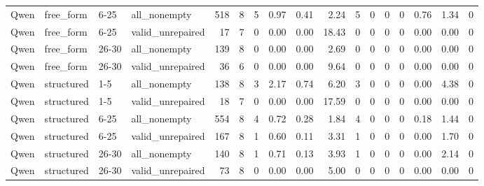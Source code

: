 \begin{longtable}{llllrrrrrrrrrrrrr}
Qwen & free\_form & 6-25 & all\_nonempty & 518 & 8 & 5 & 0.97 & 0.41 & 2.24 & 5 & 0 & 0 & 0 & 0.76 & 1.34 & 0 \\
Qwen & free\_form & 6-25 & valid\_unrepaired & 17 & 7 & 0 & 0.00 & 0.00 & 18.43 & 0 & 0 & 0 & 0 & 0.00 & 0.00 & 0 \\
Qwen & free\_form & 26-30 & all\_nonempty & 139 & 8 & 0 & 0.00 & 0.00 & 2.69 & 0 & 0 & 0 & 0 & 0.00 & 0.00 & 0 \\
Qwen & free\_form & 26-30 & valid\_unrepaired & 36 & 6 & 0 & 0.00 & 0.00 & 9.64 & 0 & 0 & 0 & 0 & 0.00 & 0.00 & 0 \\
Qwen & structured & 1-5 & all\_nonempty & 138 & 8 & 3 & 2.17 & 0.74 & 6.20 & 3 & 0 & 0 & 0 & 0.00 & 4.38 & 0 \\
Qwen & structured & 1-5 & valid\_unrepaired & 18 & 7 & 0 & 0.00 & 0.00 & 17.59 & 0 & 0 & 0 & 0 & 0.00 & 0.00 & 0 \\
Qwen & structured & 6-25 & all\_nonempty & 554 & 8 & 4 & 0.72 & 0.28 & 1.84 & 4 & 0 & 0 & 0 & 0.18 & 1.44 & 0 \\
Qwen & structured & 6-25 & valid\_unrepaired & 167 & 8 & 1 & 0.60 & 0.11 & 3.31 & 1 & 0 & 0 & 0 & 0.00 & 1.70 & 0 \\
Qwen & structured & 26-30 & all\_nonempty & 140 & 8 & 1 & 0.71 & 0.13 & 3.93 & 1 & 0 & 0 & 0 & 0.00 & 2.14 & 0 \\
Qwen & structured & 26-30 & valid\_unrepaired & 73 & 8 & 0 & 0.00 & 0.00 & 5.00 & 0 & 0 & 0 & 0 & 0.00 & 0.00 & 0 \\
\end{longtable}

